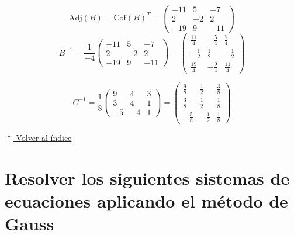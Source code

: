 \documentclass[12pt]{article}
\newcommand{\volverindice}{%
    \vspace{1em}%
    \begin{flushright}%
        \hyperlink{indice}{\small $\uparrow$ Volver al índice}%
    \end{flushright}%
}
\begin{document}
\begin{enumerate}[label=\alph*.-]
\[\begin{aligned}
    \end{aligned}
    \]
    \[
    \text{Adj}(B) = \text{Cof}(B)^T =
    \begin{pmatrix}-11&5&-7\\2&-2&2\\-19&9&-11\end{pmatrix}
    \]
    \[
    B^{-1} = \frac{1}{-4}
    \begin{pmatrix}-11&5&-7\\2&-2&2\\-19&9&-11\end{pmatrix}
    =
    \begin{pmatrix}\frac{11}{4}&-\frac{5}{4}&\frac{7}{4}\\[4pt]-\frac{1}{2}&\frac{1}{2}&-\frac{1}{2}\\[4pt]\frac{19}{4}&-\frac{9}{4}&\frac{11}{4}\end{pmatrix}
    \]

    \[
    C^{-1} = \frac{1}{8}
    \begin{pmatrix}9&4&3\\3&4&1\\-5&-4&1\end{pmatrix}
    =
    \begin{pmatrix}\frac{9}{8}&\frac{1}{2}&\frac{3}{8}\\[4pt]\frac{3}{8}&\frac{1}{2}&\frac{1}{8}\\[4pt]-\frac{5}{8}&-\frac{1}{2}&\frac{1}{8}\end{pmatrix}
    \]
\end{enumerate}

\volverindice
\newpage

\section{Resolver los siguientes sistemas de ecuaciones aplicando el método de Gauss}
\end{document}
